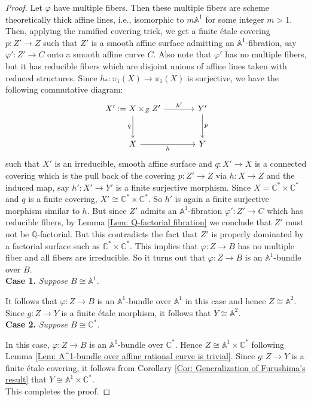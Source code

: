 \documentclass[12pt,reqno,twoside]{amsart}
\theoremstyle{definition}
\numberwithin{equation}{section}
\newcommand{\A}{\mathbb{A}}
\newcommand{\C}{\mathbb{C}}
\newcommand{\Q}{\mathbb{Q}}
\begin{document}
\begin{proof}
 
    Let $\varphi$ have multiple fibers. Then these multiple fibers are scheme theoretically thick affine lines, i.e., isomorphic to $m\A^1$ for some integer $m>1$. Then, applying the ramified covering trick, we get a finite {\'e}tale covering $p:Z'\to Z$ such that $Z'$ is a smooth affine surface admitting an $\A^1$-fibration, say $\varphi': Z' \to C$ onto a smooth affine curve $C$. Also note that $\varphi'$ has no multiple fibers, but it has reducible fibers which are disjoint unions of affine lines taken with reduced structures. 
    Since $h_\ast: \pi_1(X) \to \pi_1(X)$ is surjective, we have the following commutative diagram:
    $$
        \begin{tikzcd}[row sep=large, column sep=large]
    	X':=X \times_{Z} Z' \arrow[r, "h'"] \arrow[d, "q"'] &Y' \arrow[d, "p"]\\
    	X \arrow[r, "h"'] & Y
    	\end{tikzcd}
    $$
    such that $X'$ is an irreducible, smooth affine surface and $q: X' \to X$ is a connected covering which is the pull back of the covering $p: Z' \to Z$ via $h: X \to Z$ and the induced map, say $h': X' \to Y'$ is a finite surjective morphism. Since $X=\C^* \times \C^*$ and $q$ is a finite covering, $X' \cong \C^* \times \C^*$. So $h'$ is again a finite surjective morphism similar to $h$. But since $Z'$ admits an $\A^1$-fibration $\varphi':Z' \to C$ which has reducible fibers, by Lemma \ref{Lem: Q-factorial fibration} we conclude that $Z'$ must not be $\Q$-factorial. But this contradicts the fact that $Z'$ is properly dominated by a factorial surface such as $\C^*\times \C^*$. This implies that $\varphi : Z \to B$ has no multiple fiber and all fibers are irreducible. So it turns out that $\varphi : Z \to B$ is an $\A^1$-bundle over $B$.\\
    
    {\bf Case 1.} \emph{Suppose $B \cong \A^1$.}

    \medskip
    It follows that $\varphi : Z \to B$ is an $\A^1$-bundle over $\A^1$ in this case and hence $Z\cong \A^2$. Since $g: Z \to Y$ is a finite {\'e}tale morphism, it follows that $Y\cong \A^2$.\\
    	
    {\bf Case 2.} \emph{Suppose $B \cong \C^*$.}

    \medskip	
    
    In this case, $\varphi : Z \to B$ is an $\A^1$-bundle over $\C^*$. Hence $Z \cong \A^1 \times \C^*$ following Lemma \ref{Lem: A^1-bundle over affine rational curve is trivial}. Since $g: Z \to Y$ is a finite {\'e}tale covering, it follows from Corollary \ref{Cor: Generalization of Furushima's result} that $Y\cong \A^1\times \C^*$.\\
    	
    This completes the proof.
\end{proof}
\end{document}
